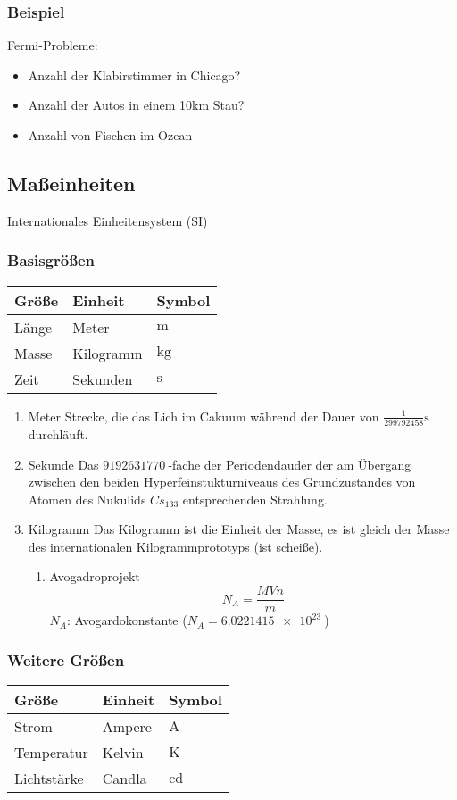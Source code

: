 \documentclass[11pt]{article}
\begin{document}
\subsubsection{Beispiel}
\label{sec-6-1-1}
Fermi-Probleme:
\begin{itemize}
\item Anzahl der Klabirstimmer in Chicago?
\item Anzahl der Autos in einem 10km Stau?
\item Anzahl von Fischen im Ozean
\end{itemize}

\subsection{Maßeinheiten}
\label{sec-6-2}
Internationales Einheitensystem (SI)
\subsubsection{Basisgrößen}
\label{sec-6-2-1}
\begin{center}
\begin{tabular}{lll}
Größe & Einheit & Symbol\\
\hline
Länge & Meter & $\si{\meter}$\\
Masse & Kilogramm & $\si{\kg}$\\
Zeit & Sekunden & $\si{\second}$\\
\end{tabular}
\end{center}
\begin{enumerate}
\item Meter
\label{sec-6-2-1-1}
Strecke, die das Lich im Cakuum während der Dauer von $\frac{1}{299792458}\si{\second}$ durchläuft.
\item Sekunde
\label{sec-6-2-1-2}
Das $\SI{9192631770}{}$-fache  der Periodendauder der am Übergang zwischen den beiden Hyperfeinstukturniveaus des Grundzustandes von Atomen des Nukulids $Cs_{133}$ entsprechenden Strahlung.
\item Kilogramm
\label{sec-6-2-1-3}
Das Kilogramm ist die Einheit der Masse, es ist gleich der Masse des internationalen Kilogrammprototyps (ist scheiße).
\begin{enumerate}
\item Avogadroprojekt
\label{sec-6-2-1-3-1}
\[N_A = \frac{M V n}{m}\]
$N_A$: Avogardokonstante ($N_A = \SI{6.0221415e23}{}$)
\end{enumerate}
\end{enumerate}
\subsubsection{Weitere Größen}
\label{sec-6-2-2}
\begin{center}
\begin{tabular}{lll}
Größe & Einheit & Symbol\\
\hline
Strom & Ampere & $\si{\ampere}$\\
Temperatur & Kelvin & $\si{\kelvin}$\\
Lichtstärke & Candla & $\si{\candela}$\\
\end{tabular}
\end{center}
\end{document}
